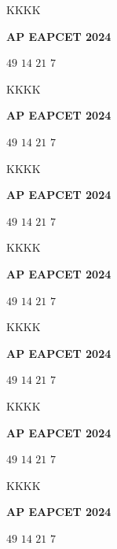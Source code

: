 \documentclass[11pt,paper=a4,answers]{exam}
\begin{document}
\begin{multicols}{2}
\begin{questions}
\question
KKKK
\begin{flushright}
\small\textbf{AP EAPCET 2024}
\end{flushright}
\begin{choices}
  \choice $49$ 
  \choice $14$ 
  \choice $21$ 
  \choice $7$ 
\end{choices}


\question
KKKK
\begin{flushright}
\small\textbf{AP EAPCET 2024}
\end{flushright}
\begin{choices}
  \choice $49$ 
  \choice $14$ 
  \choice $21$ 
  \choice $7$ 
\end{choices}

\question
KKKK
\begin{flushright}
\small\textbf{AP EAPCET 2024}
\end{flushright}
\begin{choices}
  \choice $49$ 
  \choice $14$ 
  \choice $21$ 
  \choice $7$ 
\end{choices}



\question
KKKK
\begin{flushright}
\small\textbf{AP EAPCET 2024}
\end{flushright}
\begin{choices}
  \choice $49$ 
  \choice $14$ 
  \choice $21$ 
  \choice $7$ 
\end{choices}


\question
KKKK
\begin{flushright}
\small\textbf{AP EAPCET 2024}
\end{flushright}
\begin{choices}
  \choice $49$ 
  \choice $14$ 
  \choice $21$ 
  \choice $7$ 
\end{choices}


\question
KKKK
\begin{flushright}
\small\textbf{AP EAPCET 2024}
\end{flushright}
\begin{choices}
  \choice $49$ 
  \choice $14$ 
  \choice $21$ 
  \choice $7$ 
\end{choices}




\question
KKKK
\begin{flushright}
\small\textbf{AP EAPCET 2024}
\end{flushright}
\begin{choices}
  \choice $49$ 
  \choice $14$ 
  \choice $21$ 
  \choice $7$ 
\end{choices}




\end{questions}
\end{multicols}
\end{document}

